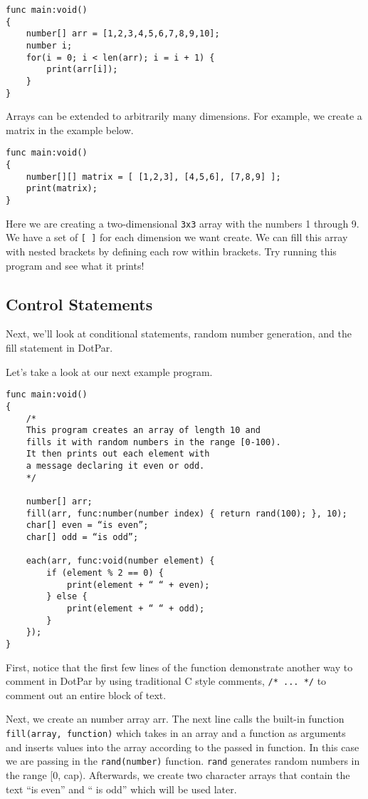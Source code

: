\documentclass{article}
\begin{document}
\begin{verbatim}
func main:void()
{
    number[] arr = [1,2,3,4,5,6,7,8,9,10];
    number i;
    for(i = 0; i < len(arr); i = i + 1) {
        print(arr[i]);
    }
}
\end{verbatim}

Arrays can be extended to arbitrarily many dimensions. For example, we create a matrix in the example below.

\begin{verbatim}
func main:void()
{
    number[][] matrix = [ [1,2,3], [4,5,6], [7,8,9] ];
    print(matrix);
}
\end{verbatim}

Here we are creating a two-dimensional \verb!3x3! array with the numbers 1 through 9.  We have a  set of \verb![ ]! for each dimension we want create.  We can fill this array with nested brackets by defining each row within brackets. Try running this program and see what it prints!

\subsection{Control Statements}

Next, we’ll look at conditional statements, random number generation, and the fill statement in DotPar. 

Let’s take a look at our next example program.

\begin{verbatim}
func main:void()
{
    /*
    This program creates an array of length 10 and 
    fills it with random numbers in the range [0-100).
    It then prints out each element with 
    a message declaring it even or odd.  
    */

    number[] arr;
    fill(arr, func:number(number index) { return rand(100); }, 10);
    char[] even = “is even”;
    char[] odd = “is odd”;

    each(arr, func:void(number element) {
        if (element % 2 == 0) {
            print(element + “ “ + even);
        } else {
            print(element + “ “ + odd);
        }
    });
}
\end{verbatim}

First, notice that the first few lines of the function demonstrate another way to comment in DotPar by using traditional C style comments, \verb!/* ... */! to comment out an entire block of text.

Next, we create an number array arr. The next line calls the built-in function \verb!fill(array, function)! which takes in an array and a function as arguments and inserts values into the array according to the passed in function. In this case we are passing in the \verb!rand(number)! function. \verb!rand! generates random numbers in the range [0, cap). Afterwards, we create two character arrays that contain the text “is even” and “ is odd” which will be used later.
\end{document}
